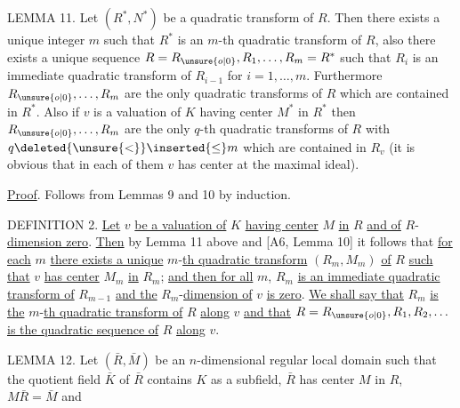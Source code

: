 
LEMMA 11. Let $(R^*,N^*)$ be a quadratic transform of $R$. Then there exists a unique integer $m$ such that $R^*$ is an $m$-th quadratic transform of $R$, also there exists a unique sequence $R=R_{\unsure{o|0}},R_1,\ldots,R_m=R^*$ such that $R_i$ is an immediate quadratic transform of $R_{i-1}$ for $i=1,\ldots,m$. Furthermore $R_{\unsure{o|0}},\ldots,R_m$ are the only quadratic transforms of $R$ which are contained in $R^*$. Also if $v$ is a valuation of $K$ having center $M^*$ in $R^*$ then $R_{\unsure{o|0}},\ldots,R_m$ are the only $q$-th quadratic transforms of $R$ with $q\deleted{\unsure{<}}\inserted{\leq}m$ which are contained in $R_v$ (it is obvious that in each of them $v$ has center at the maximal ideal).

\uline{Proof}. Follows from Lemmas 9 and 10 by induction.

DEFINITION 2. \uline{Let} $v$ \uline{be a valuation of} $K$ \uline{having center} $M$ \uline{in} $R$ \uline{and of} $R$-\uline{dimension zero}. \uline{Then} by Lemma 11 above and [A6, Lemma 10] it follows that \uline{for each} $m$ \uline{there exists a unique} $m$-\uline{th quadratic transform} $(R_m,M_m)$ \uline{of} $R$ \uline{such that} $v$ \uline{has center} $M_m$ \uline{in} $R_m$; \uline{and then for all} $m$, $R_m$ \uline{is an immediate quadratic transform of} $R_{m-1}$ \uline{and the} $R_m$-\uline{dimension of} $v$ \uline{is zero}. \uline{We shall say that} $R_m$ \uline{is the} $m$-\uline{th quadratic transform of} $R$ \uline{along} $v$ \uline{and that} $R=R_{\unsure{o|0}},R_1,R_2,\ldots$ \uline{is the quadratic sequence of} $R$ \uline{along} $v$.

LEMMA 12. Let $(\bar R,\bar M)$ be an $n$-dimensional regular local domain such that the quotient field $\bar K$ of $\bar R$ contains $K$ as a subfield, $\bar R$ has center $M$ in $R$, $M\bar R=\bar M$ and
